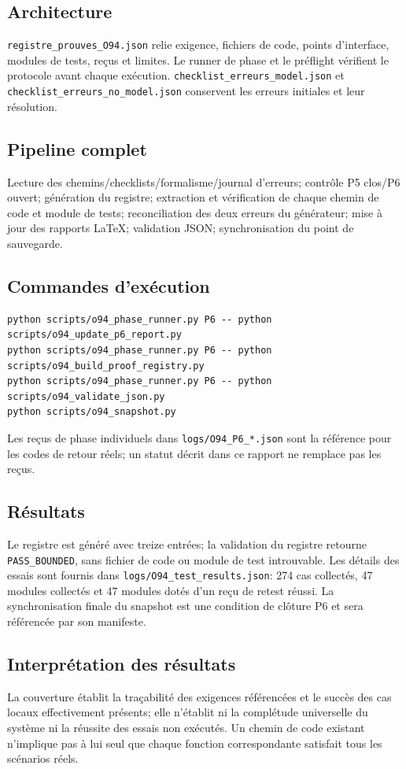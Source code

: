 \documentclass[11pt,a4paper]{article}
\begin{document}
\subsection{Architecture}
\texttt{registre\_prouves\_O94.json} relie exigence, fichiers de code, points d’interface, modules de tests, reçus et limites. Le runner de phase et le préflight vérifient le protocole avant chaque exécution. \texttt{checklist\_erreurs\_model.json} et \texttt{checklist\_erreurs\_no\_model.json} conservent les erreurs initiales et leur résolution.
\subsection{Pipeline complet}
Lecture des chemins/checklists/formalisme/journal d’erreurs; contrôle P5 clos/P6 ouvert; génération du registre; extraction et vérification de chaque chemin de code et module de tests; reconciliation des deux erreurs du générateur; mise à jour des rapports LaTeX; validation JSON; synchronisation du point de sauvegarde.
\subsection{Commandes d'exécution}
\begin{verbatim}
python scripts/o94_phase_runner.py P6 -- python scripts/o94_update_p6_report.py
python scripts/o94_phase_runner.py P6 -- python scripts/o94_build_proof_registry.py
python scripts/o94_phase_runner.py P6 -- python scripts/o94_validate_json.py
python scripts/o94_snapshot.py
\end{verbatim}
Les reçus de phase individuels dans \texttt{logs/O94\_P6\_*.json} sont la référence pour les codes de retour réels; un statut décrit dans ce rapport ne remplace pas les reçus.
\subsection{Résultats}
Le registre est généré avec treize entrées; la validation du registre retourne \texttt{PASS\_BOUNDED}, sans fichier de code ou module de test introuvable. Les détails des essais sont fournis dans \texttt{logs/O94\_test\_results.json}: 274 cas collectés, 47 modules collectés et 47 modules dotés d’un reçu de retest réussi. La synchronisation finale du snapshot est une condition de clôture P6 et sera référencée par son manifeste.
\subsection{Interprétation des résultats}
La couverture établit la traçabilité des exigences référencées et le succès des cas locaux effectivement présents; elle n’établit ni la complétude universelle du système ni la réussite des essais non exécutés. Un chemin de code existant n’implique pas à lui seul que chaque fonction correspondante satisfait tous les scénarios réels.
\end{document}
